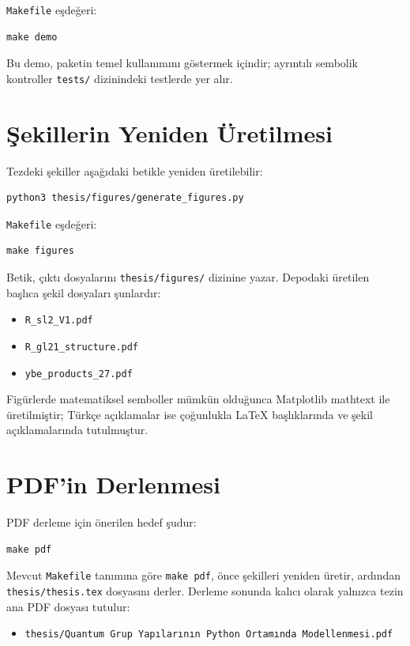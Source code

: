 \documentclass[12pt,a4paper]{report}
\numberwithin{equation}{chapter}
\theoremstyle{plain}
\theoremstyle{definition}
\begin{document}
\texttt{Makefile} eşdeğeri:
\begin{lstlisting}[style=bashblock]
make demo
\end{lstlisting}

Bu demo, paketin temel kullanımını göstermek içindir; ayrıntılı sembolik
kontroller \texttt{tests/} dizinindeki testlerde yer alır.

\section{Şekillerin Yeniden Üretilmesi}

Tezdeki şekiller aşağıdaki betikle yeniden üretilebilir:
\begin{lstlisting}[style=bashblock]
python3 thesis/figures/generate_figures.py
\end{lstlisting}

\texttt{Makefile} eşdeğeri:
\begin{lstlisting}[style=bashblock]
make figures
\end{lstlisting}

Betik, çıktı dosyalarını \texttt{thesis/figures/} dizinine yazar. Depodaki
üretilen başlıca şekil dosyaları şunlardır:
\begin{itemize}[leftmargin=*]
  \item \texttt{R\_sl2\_V1.pdf}
  \item \texttt{R\_gl21\_structure.pdf}
  \item \texttt{ybe\_products\_27.pdf}
\end{itemize}

Figürlerde matematiksel semboller mümkün olduğunca Matplotlib mathtext ile
üretilmiştir; Türkçe açıklamalar ise çoğunlukla LaTeX başlıklarında ve şekil
açıklamalarında tutulmuştur.

\section{PDF'in Derlenmesi}

PDF derleme için önerilen hedef şudur:
\begin{lstlisting}[style=bashblock]
make pdf
\end{lstlisting}

Mevcut \texttt{Makefile} tanımına göre \texttt{make pdf}, önce şekilleri yeniden
üretir, ardından \texttt{thesis/thesis.tex} dosyasını derler. Derleme sonunda
kalıcı olarak yalnızca tezin ana PDF dosyası tutulur:
\begin{itemize}[leftmargin=*]
  \item \texttt{thesis/Quantum Grup Yapılarının Python Ortamında Modellenmesi.pdf}
\end{itemize}
\end{document}
